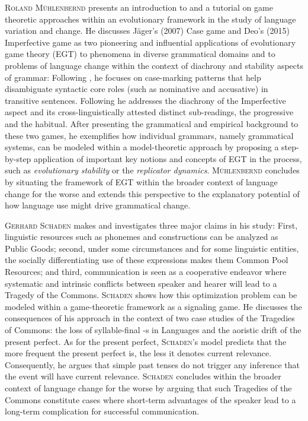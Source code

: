 \documentclass[output=paper,colorlinks,citecolor=brown]{langscibook}
\begin{document}
\textsc{Roland Mühlenbernd} presents an introduction to and a tutorial on game theoretic approaches within an evolutionary framework in the study of language variation and change. He discusses Jäger’s (2007) Case game and Deo’s (2015) Imperfective game as two pioneering and influential applications of evolutionary game theory (EGT) to phenomena in diverse grammatical domains and to problems of language change within the context of diachrony and stability aspects of grammar: Following \citet{Jäger_2007}, he focuses on case-marking patterns that help disambiguate syntactic core roles (such as nominative and accusative) in transitive sentences. Following \citet{Deo_2015} he addresses the diachrony of the Imperfective aspect and its cross-linguistically attested distinct sub-readings, the progressive and the habitual. After presenting the grammatical and empirical background to these two games, he exemplifies how individual grammars, namely grammatical systems, can be modeled within a model-theoretic approach by proposing a step-by-step application of important key notions and concepts of EGT in the process, such as \textit{evolutionary stability} or the \textit{replicator dynamics}. \textsc{Mühlenbernd} concludes by situating the framework of EGT within the broader context of language change for the worse and extends this perspective to the explanatory potential of how language use might drive grammatical change.  

\textsc{Gerhard Schaden} makes and investigates three major claims in his study: First, linguistic resources such as phonemes and constructions can be analyzed as Public Goods; second, under some circumstances and for some linguistic entities, the socially differentiating use of these expressions makes them Common Pool Resources; and third, communication is seen as a cooperative endeavor where systematic and intrinsic conflicts between speaker and hearer will lead to a Tragedy of the Commons. \textsc{Schaden} shows how this optimization problem can be modeled within a game-theoretic framework as a signaling game. He discusses the consequences of his approach in the context of two case studies of the Tragedies of Commons: the loss of syllable-final -s in   Languages and the aoristic drift of the present perfect. As for the present perfect, \textsc{Schaden}’s model predicts that the more frequent the present perfect is, the less it denotes current relevance. Consequently, he argues that simple past tenses do not trigger any inference that the event will have current relevance. \textsc{Schaden} concludes within the broader context of language change for the worse by arguing that such Tragedies of the Commons constitute cases where short-term advantages of the speaker lead to a long-term complication for successful communication.  
\end{document}
